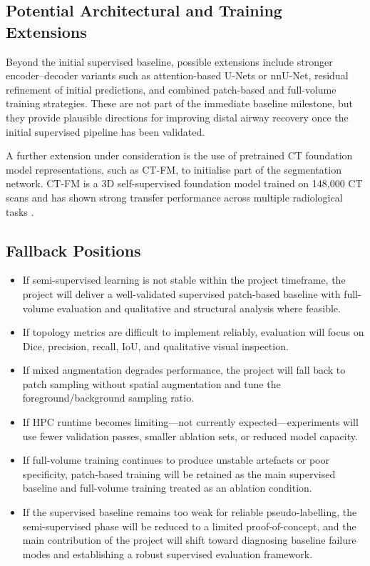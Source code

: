 \documentclass[11pt,a4paper]{article}
\begin{document}
\subsection{Potential Architectural and Training Extensions}

Beyond the initial supervised baseline, possible extensions include stronger encoder--decoder variants such as attention-based U-Nets or nnU-Net, residual refinement of initial predictions, and combined patch-based and full-volume training strategies. These are not part of the immediate baseline milestone, but they provide plausible directions for improving distal airway recovery once the initial supervised pipeline has been validated.

A further extension under consideration is the use of pretrained CT foundation model representations, such as CT-FM, to initialise part of the segmentation network. CT-FM is a 3D self-supervised foundation model trained on 148{,}000 CT scans and has shown strong transfer performance across multiple radiological tasks \cite{Pai2025CTFM}. 

\subsection{Fallback Positions}
\begin{itemize}
    \item If semi-supervised learning is not stable within the project timeframe, the project will deliver a well-validated supervised patch-based baseline with full-volume evaluation and qualitative and structural analysis where feasible.
    \item If topology metrics are difficult to implement reliably, evaluation will focus on Dice, precision, recall, IoU, and qualitative visual inspection.
    \item If mixed augmentation degrades performance, the project will fall back to patch sampling without spatial augmentation and tune the foreground/background sampling ratio.
    \item If HPC runtime becomes limiting---not currently expected---experiments will use fewer validation passes, smaller ablation sets, or reduced model capacity.
    \item If full-volume training continues to produce unstable artefacts or poor specificity, patch-based training will be retained as the main supervised baseline and full-volume training treated as an ablation condition.
    \item If the supervised baseline remains too weak for reliable pseudo-labelling, the semi-supervised phase will be reduced to a limited proof-of-concept, and the main contribution of the project will shift toward diagnosing baseline failure modes and establishing a robust supervised evaluation framework.
\end{itemize}
\end{document}
